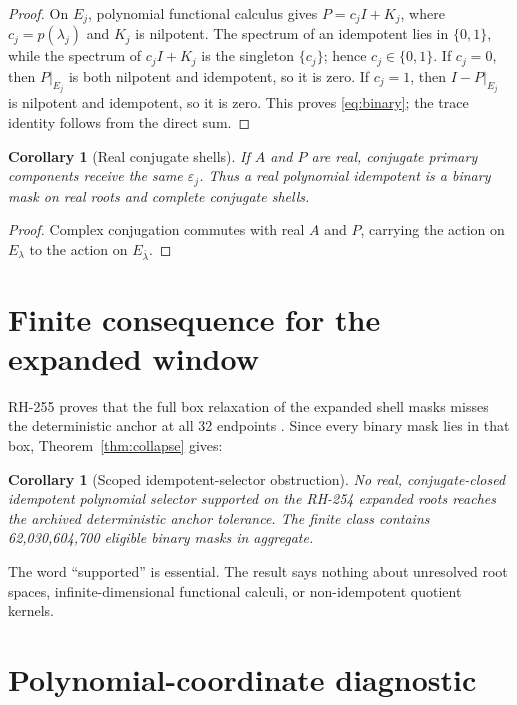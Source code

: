 \documentclass[11pt]{article}
\newtheorem{corollary}[theorem]{Corollary}
\theoremstyle{remark}
\begin{document}
\begin{proof}
On $E_j$, polynomial functional calculus gives
$P=c_jI+K_j$, where $c_j=p(\lambda_j)$ and $K_j$ is nilpotent.  The spectrum
of an idempotent lies in $\{0,1\}$, while the spectrum of $c_jI+K_j$ is the
singleton $\{c_j\}$; hence $c_j\in\{0,1\}$.  If $c_j=0$, then $P|_{E_j}$ is
both nilpotent and idempotent, so it is zero.  If $c_j=1$, then
$I-P|_{E_j}$ is nilpotent and idempotent, so it is zero.  This proves
\eqref{eq:binary}; the trace identity follows from the direct sum.
\end{proof}

\begin{corollary}[Real conjugate shells]
If $A$ and $P$ are real, conjugate primary components receive the same
$\varepsilon_j$.  Thus a real polynomial idempotent is a binary mask on real
roots and complete conjugate shells.
\end{corollary}

\begin{proof}
Complex conjugation commutes with real $A$ and $P$, carrying the action on
$E_\lambda$ to the action on $E_{\bar\lambda}$.
\end{proof}

\section{Finite consequence for the expanded window}

RH-255 proves that the full box relaxation of the expanded shell masks misses
the deterministic anchor at all 32 endpoints \citep{WangRH255}.  Since every
binary mask lies in that box, Theorem~\ref{thm:collapse} gives:

\begin{corollary}[Scoped idempotent-selector obstruction]
No real, conjugate-closed idempotent polynomial selector supported on the
RH-254 expanded roots reaches the archived deterministic anchor tolerance.
The finite class contains 62,030,604,700 eligible binary masks in aggregate.
\end{corollary}

The word ``supported'' is essential.  The result says nothing about unresolved
root spaces, infinite-dimensional functional calculi, or non-idempotent
quotient kernels.

\section{Polynomial-coordinate diagnostic}
\end{document}
